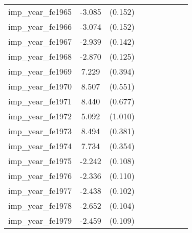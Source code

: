 {\begin{tabular}{l*{4}{cc}}
imp\_year\_fe1965&   -3.085\sym{***}&  (0.152)&                  &         &                  &         &                  &         \\
imp\_year\_fe1966&   -3.074\sym{***}&  (0.152)&                  &         &                  &         &                  &         \\
imp\_year\_fe1967&   -2.939\sym{***}&  (0.142)&                  &         &                  &         &                  &         \\
imp\_year\_fe1968&   -2.870\sym{***}&  (0.125)&                  &         &                  &         &                  &         \\
imp\_year\_fe1969&    7.229\sym{***}&  (0.394)&                  &         &                  &         &                  &         \\
imp\_year\_fe1970&    8.507\sym{***}&  (0.551)&                  &         &                  &         &                  &         \\
imp\_year\_fe1971&    8.440\sym{***}&  (0.677)&                  &         &                  &         &                  &         \\
imp\_year\_fe1972&    5.092\sym{***}&  (1.010)&                  &         &                  &         &                  &         \\
imp\_year\_fe1973&    8.494\sym{***}&  (0.381)&                  &         &                  &         &                  &         \\
imp\_year\_fe1974&    7.734\sym{***}&  (0.354)&                  &         &                  &         &                  &         \\
imp\_year\_fe1975&   -2.242\sym{***}&  (0.108)&                  &         &                  &         &                  &         \\
imp\_year\_fe1976&   -2.336\sym{***}&  (0.110)&                  &         &                  &         &                  &         \\
imp\_year\_fe1977&   -2.438\sym{***}&  (0.102)&                  &         &                  &         &                  &         \\
imp\_year\_fe1978&   -2.652\sym{***}&  (0.104)&                  &         &                  &         &                  &         \\
imp\_year\_fe1979&   -2.459\sym{***}&  (0.109)&                  &         &                  &         &                  &         \\

\end{tabular}}
